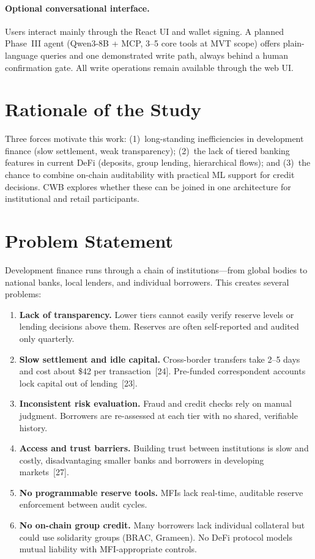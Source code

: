 \documentclass[12pt,a4paper]{report}
\begin{document}
\paragraph{Optional conversational interface.}
Users interact mainly through the React UI and wallet signing. A planned Phase~III agent (Qwen3-8B + MCP, 3--5 core tools at MVT scope) offers plain-language queries and one demonstrated write path, always behind a human confirmation gate. All write operations remain available through the web UI.

\section{Rationale of the Study}
\label{sec:rationale}

Three forces motivate this work: (1)~long-standing inefficiencies in development finance (slow settlement, weak transparency); (2)~the lack of tiered banking features in current DeFi (deposits, group lending, hierarchical flows); and (3)~the chance to combine on-chain auditability with practical ML support for credit decisions. CWB explores whether these can be joined in one architecture for institutional and retail participants.

\section{Problem Statement}
\label{sec:problem-statement}

Development finance runs through a chain of institutions---from global bodies to national banks, local lenders, and individual borrowers. This creates several problems:

\begin{enumerate}[noitemsep]
\item \textbf{Lack of transparency.} Lower tiers cannot easily verify reserve levels or lending decisions above them. Reserves are often self-reported and audited only quarterly.

\item \textbf{Slow settlement and idle capital.} Cross-border transfers take 2--5 days and cost about \$42 per transaction~[24]. Pre-funded correspondent accounts lock capital out of lending~[23].

\item \textbf{Inconsistent risk evaluation.} Fraud and credit checks rely on manual judgment. Borrowers are re-assessed at each tier with no shared, verifiable history.

\item \textbf{Access and trust barriers.} Building trust between institutions is slow and costly, disadvantaging smaller banks and borrowers in developing markets~[27].

\item \textbf{No programmable reserve tools.} MFIs lack real-time, auditable reserve enforcement between audit cycles.

\item \textbf{No on-chain group credit.} Many borrowers lack individual collateral but could use solidarity groups (BRAC, Grameen). No DeFi protocol models mutual liability with MFI-appropriate controls.
\end{enumerate}
\end{document}
